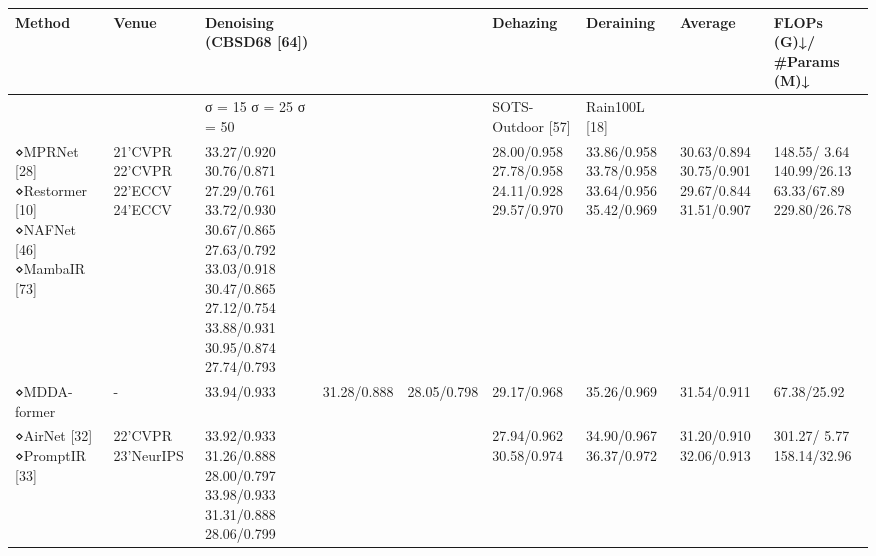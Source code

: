 \begin{tabular}{lllllllll}
\toprule
Method & Venue & Denoising (CBSD68 [64]) &  &  & Dehazing & Deraining & Average & FLOPs (G)↓/ \#Params (M)↓ \\
\midrule
 &  & σ = 15 σ = 25 σ = 50 &  &  & SOTS-Outdoor [57] & Rain100L [18] &  &  \\
⋄MPRNet [28] ⋄Restormer [10] ⋄NAFNet [46] ⋄MambaIR [73] & 21’CVPR 22’CVPR 22’ECCV 24’ECCV & 33.27/0.920 30.76/0.871 27.29/0.761 33.72/0.930 30.67/0.865 27.63/0.792 33.03/0.918 30.47/0.865 27.12/0.754 33.88/0.931 30.95/0.874 27.74/0.793 &  &  & 28.00/0.958 27.78/0.958 24.11/0.928 29.57/0.970 & 33.86/0.958 33.78/0.958 33.64/0.956 35.42/0.969 & 30.63/0.894 30.75/0.901 29.67/0.844 31.51/0.907 & 148.55/ 3.64 140.99/26.13 63.33/67.89 229.80/26.78 \\
⋄MDDA-former & - & 33.94/0.933 & 31.28/0.888 & 28.05/0.798 & 29.17/0.968 & 35.26/0.969 & 31.54/0.911 & 67.38/25.92 \\
⋄AirNet [32] ⋄PromptIR [33] & 22’CVPR 23’NeurIPS & 33.92/0.933 31.26/0.888 28.00/0.797 33.98/0.933 31.31/0.888 28.06/0.799 &  &  & 27.94/0.962 30.58/0.974 & 34.90/0.967 36.37/0.972 & 31.20/0.910 32.06/0.913 & 301.27/ 5.77 158.14/32.96 \\
\bottomrule
\end{tabular}
